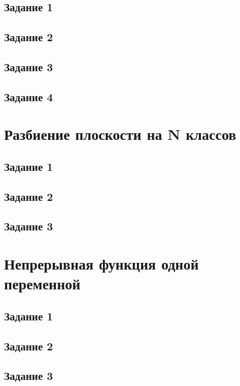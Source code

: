 \subsection{Задание 1}

\subsection{Задание 2}

\subsection{Задание 3}

\subsection{Задание 4}

\section{Разбиение плоскости на N классов}

\subsection{Задание 1}

\subsection{Задание 2}

\subsection{Задание 3}

\section{Непрерывная функция одной переменной}

\subsection{Задание 1}

\subsection{Задание 2}

\subsection{Задание 3}


